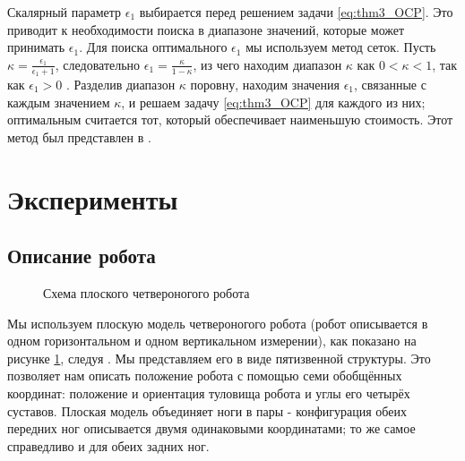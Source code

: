 Скалярный параметр $\epsilon_1$ выбирается перед решением задачи \eqref{eq:thm3_OCP}. Это приводит к необходимости поиска в диапазоне значений, которые может принимать $\epsilon_1$. Для поиска оптимального $\epsilon_1$ мы используем метод сеток. Пусть $\kappa=\frac{\epsilon_1}{\epsilon_1+1}$, следовательно
$\epsilon_1=\frac{\kappa}{1-\kappa}$, из чего находим диапазон $\kappa$ как $0 < \kappa < 1$, так как $\epsilon_1 > 0$ \cite{Li1997}. Разделив диапазон $\kappa$ поровну, находим значения $\epsilon_1$, связанные с каждым значением $\kappa$, и решаем задачу \eqref{eq:thm3_OCP} для каждого из них; оптимальным считается тот, который обеспечивает наименьшую стоимость. Этот метод был представлен в \cite{Li1997}.

\section{Эксперименты}\label{sec:ch3/sect3}

\subsection{Описание робота}\label{sec:ch3/sect3/sub1}
\begin{figure}[ht]
	\caption{Схема плоского четвероногого робота}\label{fig:robotSagital}
\end{figure} 
Мы используем плоскую модель четвероногого робота (робот описывается в одном горизонтальном и одном вертикальном измерении), как показано на рисунке \ref{fig:robotSagital}, следуя \cite{RobotConfig}. Мы представляем его в виде пятизвенной структуры. Это позволяет нам описать положение робота с помощью семи обобщённых координат: положение и ориентация туловища робота и углы его четырёх суставов. Плоская модель объединяет ноги в пары - конфигурация обеих передних ног описывается двумя одинаковыми координатами; то же самое справедливо и для обеих задних ног. 

